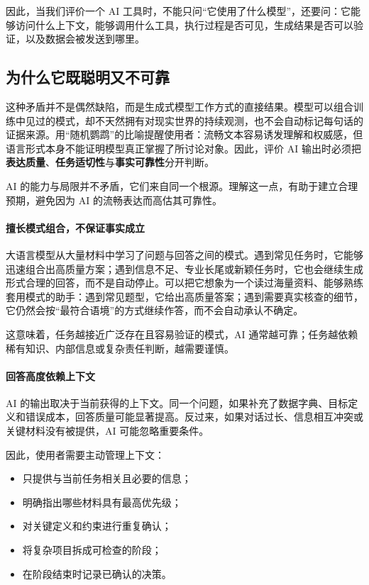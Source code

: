 因此，当我们评价一个 AI 工具时，不能只问“它使用了什么模型”，还要问：它能够访问什么上下文，能够调用什么工具，执行过程是否可见，生成结果是否可以验证，以及数据会被发送到哪里。

\subsection{为什么它既聪明又不可靠}

这种矛盾并不是偶然缺陷，而是生成式模型工作方式的直接结果。模型可以组合训练中见过的模式，却不天然拥有对现实世界的持续观测，也不会自动标记每句话的证据来源。\citet{bender2021stochastic}用“随机鹦鹉”的比喻提醒使用者：流畅文本容易诱发理解和权威感，但语言形式本身不能证明模型真正掌握了所讨论对象。因此，评价 AI 输出时必须把\textbf{表达质量}、\textbf{任务适切性}与\textbf{事实可靠性}分开判断。

AI 的能力与局限并不矛盾，它们来自同一个根源。理解这一点，有助于建立合理预期，避免因为 AI 的流畅表达而高估其可靠性。

\paragraph{擅长模式组合，不保证事实成立}

大语言模型从大量材料中学习了问题与回答之间的模式。遇到常见任务时，它能够迅速组合出高质量方案；遇到信息不足、专业长尾或新颖任务时，它也会继续生成形式合理的回答，而不是自动停止。可以把它想象为一个读过海量资料、能够熟练套用模式的助手：遇到常见题型，它给出高质量答案；遇到需要真实核查的细节，它仍然会按“最符合语境”的方式继续作答，而不会自动承认不确定。

这意味着，任务越接近广泛存在且容易验证的模式，AI 通常越可靠；任务越依赖稀有知识、内部信息或复杂责任判断，越需要谨慎。

\paragraph{回答高度依赖上下文}

AI 的输出取决于当前获得的上下文。同一个问题，如果补充了数据字典、目标定义和错误成本，回答质量可能显著提高。反过来，如果对话过长、信息相互冲突或关键材料没有被提供，AI 可能忽略重要条件。

因此，使用者需要主动管理上下文：

\begin{itemize}
  \item 只提供与当前任务相关且必要的信息；
  \item 明确指出哪些材料具有最高优先级；
  \item 对关键定义和约束进行重复确认；
  \item 将复杂项目拆成可检查的阶段；
  \item 在阶段结束时记录已确认的决策。
\end{itemize}

